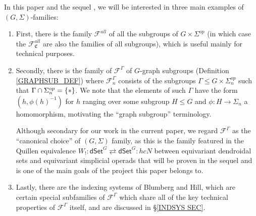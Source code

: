 \documentclass[a4paper,10pt
,draft
]{article}%
\numberwithin{equation}{section}
\numberwithin{figure}{section}
\theoremstyle{definition} %
\newcommand{\F}{\ensuremath{\mathcal F}}
\newcommand{\1}{\ensuremath{\mathbbm 1}}%
\begin{document}
In this paper and the sequel \cite{BP_TAS}, 
we will be interested in three main examples of $(G,\Sigma)$-families:

\begin{enumerate}[label = (\alph*)]
\item First, there is the family $\F^{all}$ of all the subgroups of $G \times \Sigma^{op}$
      (in which case the $\F^{all}_{\mathfrak{C}}$ are also the families of all subgroups), which is useful mainly for technical purposes.
      
\item Secondly, there is the family of $\F^{\Gamma}$
      of $G$-graph subgroups (Definition \ref{GRAPHSUB_DEF})
      where $\F^{\Gamma}_n$ consists of the subgroups
      $\Gamma \leq G \times \Sigma_n^{op}$
      such that $\Gamma \cap \Sigma_n^{op} = \{\**\}$.
      We note that the elements of such $\Gamma$
      have the form $(h,\phi(h)^{-1})$
      for $h$ ranging over some subgroup $H \leq G$
      and $\phi \colon H \to \Sigma_n$
      a homomorphism,
      motivating the ``graph subgroup'' terminology.
      
      Although secondary for our work in the current paper, we regard $\F^{\Gamma}$ as the ``canonical choice'' of $(G,\Sigma)$ family, 
      as this is the family featured in the Quillen equivalence
      $W_! \colon 
      \mathsf{dSet}^G \rightleftarrows 
      \mathsf{dSet}^G \colon hcN$
      between equivariant dendroidal sets
      and equivariant simplicial operads
      that will be proven in the sequel and is one of the main goals of the project this paper belongs to.
      
\item Lastly, there are the indexing systems of Blumberg and Hill,
      which are certain special subfamilies of $\F^{\Gamma}$
      which share all of the key technical properties of 
      $\F^{\Gamma}$ itself,
      and are discussed in \S \ref{INDSYS SEC}.
\end{enumerate}
\end{document}
